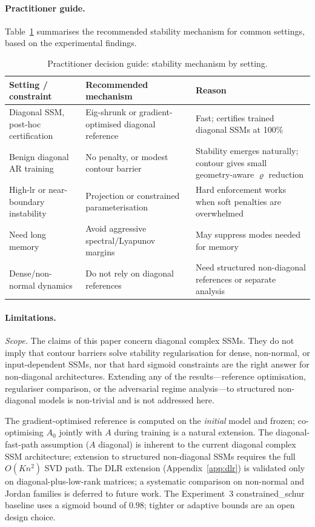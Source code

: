 \documentclass{article}
\theoremstyle{definition}
\begin{document}
\paragraph{Practitioner guide.}
Table~\ref{tab:practitioner} summarises the recommended stability mechanism
for common settings, based on the experimental findings.

\begin{table}[t]
\centering
\caption{Practitioner decision guide: stability mechanism by setting.}
\label{tab:practitioner}
\small
\begin{tabular}{p{2.9cm}p{3.5cm}p{4.3cm}}
\toprule
Setting / constraint & Recommended mechanism & Reason \\
\midrule
Diagonal SSM, post-hoc certification
  & Eig-shrunk or gradient-optimised diagonal reference
  & Fast; certifies trained diagonal SSMs at 100\% \\
Benign diagonal AR training
  & No penalty, or modest contour barrier
  & Stability emerges naturally; contour gives small geometry-aware $\varrho$ reduction \\
High-lr or near-boundary instability
  & Projection or constrained parameterisation
  & Hard enforcement works when soft penalties are overwhelmed \\
Need long memory
  & Avoid aggressive spectral/Lyapunov margins
  & May suppress modes needed for memory \\
Dense/non-normal dynamics
  & Do not rely on diagonal references
  & Need structured non-diagonal references or separate analysis \\
\bottomrule
\end{tabular}
\end{table}

\paragraph{Limitations.}
\emph{Scope.}
The claims of this paper concern diagonal complex SSMs.  They do not
imply that contour barriers solve stability regularisation for dense,
non-normal, or input-dependent SSMs, nor that hard sigmoid constraints
are the right answer for non-diagonal architectures.  Extending any
of the results---reference optimisation, regulariser comparison, or the
adversarial regime analysis---to structured non-diagonal models is
non-trivial and is not addressed here.

The gradient-optimised reference is computed on the \emph{initial}
model and frozen; co-optimising $A_0$ jointly with $A$ during training
is a natural extension.
The diagonal-fast-path assumption ($A$ diagonal) is inherent to the
current diagonal complex SSM architecture; extension to structured
non-diagonal SSMs requires the full $O(Kn^2)$ SVD path.
The DLR extension (Appendix~\ref{app:dlr}) is validated only on
diagonal-plus-low-rank matrices; a systematic comparison on non-normal
and Jordan families is deferred to future work.
The Experiment~3 constrained\_schur baseline uses a sigmoid bound of
$0.98$; tighter or adaptive bounds are an open design choice.
\end{document}
